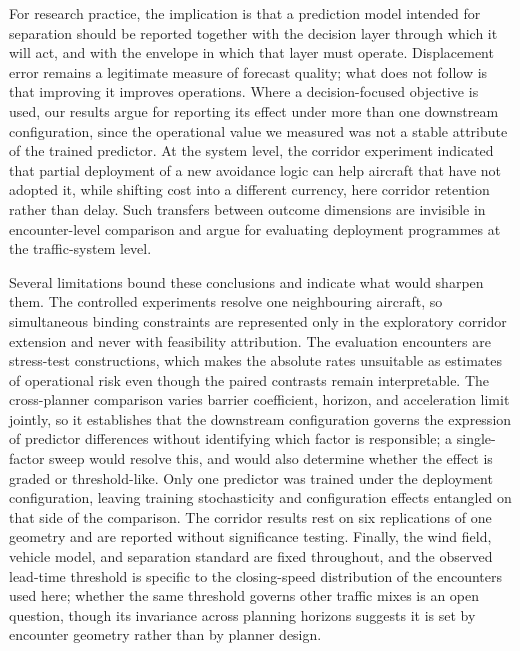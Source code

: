 \documentclass[11pt]{article}
\theoremstyle{plain}
\theoremstyle{definition}
\begin{document}
For research practice, the implication is that a prediction model
intended for separation should be reported together with the decision
layer through which it will act, and with the envelope in which that
layer must operate. Displacement error remains a legitimate measure of
forecast quality; what does not follow is that improving it improves
operations. Where a decision-focused objective is used, our results
argue for reporting its effect under more than one downstream
configuration, since the operational value we measured was not a stable
attribute of the trained predictor. At the system level, the corridor
experiment indicated that partial deployment of a new avoidance logic
can help aircraft that have not adopted it, while shifting cost into a
different currency, here corridor retention rather than delay. Such
transfers between outcome dimensions are invisible in encounter-level
comparison and argue for evaluating deployment programmes at the
traffic-system level.

Several limitations bound these conclusions and indicate what would
sharpen them. The controlled experiments resolve one neighbouring
aircraft, so simultaneous binding constraints are represented only in
the exploratory corridor extension and never with feasibility
attribution. The evaluation encounters are stress-test constructions,
which makes the absolute rates unsuitable as estimates of operational
risk even though the paired contrasts remain interpretable. The
cross-planner comparison varies barrier coefficient, horizon, and
acceleration limit jointly, so it establishes that the downstream
configuration governs the expression of predictor differences without
identifying which factor is responsible; a single-factor sweep would
resolve this, and would also determine whether the effect is graded or
threshold-like. Only one predictor was trained under the deployment
configuration, leaving training stochasticity and configuration effects
entangled on that side of the comparison. The corridor results rest on
six replications of one geometry and are reported without significance
testing. Finally, the wind field, vehicle model, and separation
standard are fixed throughout, and the observed lead-time threshold is
specific to the closing-speed distribution of the encounters used here;
whether the same threshold governs other traffic mixes is an open
question, though its invariance across planning horizons suggests it is
set by encounter geometry rather than by planner design.
\end{document}
